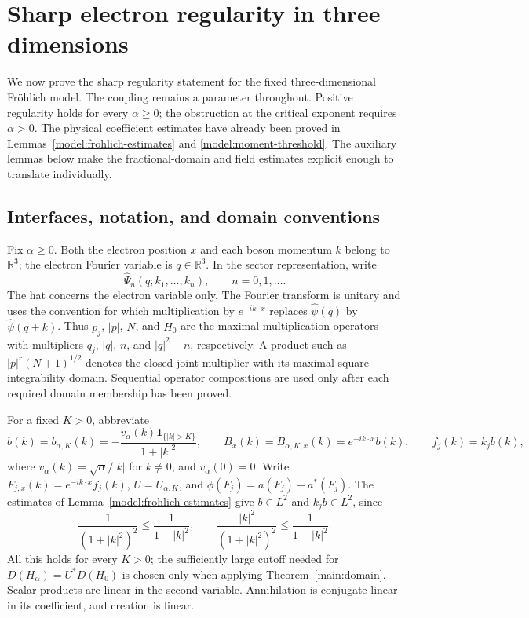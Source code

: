 \documentclass[11pt,a4paper]{article}
\theoremstyle{definition}
\theoremstyle{remark}
\begin{document}
\section{Sharp electron regularity in three dimensions}
\label{reg:section}

We now prove the sharp regularity statement for the fixed three-dimensional
Fr\"ohlich model. The coupling remains a parameter throughout. Positive
regularity holds for every \(\alpha\geq0\); the obstruction at the critical
exponent requires \(\alpha>0\). The physical coefficient estimates have
already been proved in Lemmas~\ref{model:frohlich-estimates} and
\ref{model:moment-threshold}. The auxiliary lemmas below make the
fractional-domain and field estimates explicit enough to translate
individually.

\subsection{Interfaces, notation, and domain conventions}
\label{reg:interfaces}

Fix \(\alpha\geq0\). Both the electron position \(x\) and each boson
momentum \(k\) belong to \(\mathbb R^3\); the electron Fourier variable
is \(q\in\mathbb R^3\). In the sector representation, write
\[
 \widehat\Psi_n(q;k_1,\ldots,k_n),\qquad n=0,1,\ldots.
\]
The hat concerns the electron variable only. The Fourier transform is
unitary and uses the convention for which multiplication by
\(e^{-ik\cdot x}\) replaces \(\widehat\psi(q)\) by
\(\widehat\psi(q+k)\). Thus \(p_j\), \(|p|\), \(N\), and \(H_0\)
are the maximal multiplication operators with multipliers \(q_j\),
\(|q|\), \(n\), and \(|q|^2+n\), respectively. A product such as
\(|p|^r(N+1)^{1/2}\) denotes the closed joint multiplier with its
maximal square-integrability domain. Sequential operator compositions
are used only after each required domain membership has been proved.

For a fixed \(K>0\), abbreviate
\begin{equation}
 b(k)=b_{\alpha,K}(k)
   =-\frac{v_\alpha(k)\mathbf1_{\{|k|>K\}}}{1+|k|^2},\qquad
 B_x(k)=B_{\alpha,K,x}(k)=e^{-ik\cdot x}b(k),\qquad f_j(k)=k_jb(k),
 \label{reg:def-b}
\end{equation}
where \(v_\alpha(k)=\sqrt\alpha/|k|\) for \(k\ne0\), and
\(v_\alpha(0)=0\). Write \(F_{j,x}(k)=e^{-ik\cdot x}f_j(k)\),
\(U=U_{\alpha,K}\), and \(\phi(F_j)=a(F_j)+a^*(F_j)\).
The estimates of Lemma~\ref{model:frohlich-estimates} give
\(b\in L^2\) and \(k_jb\in L^2\), since
\[
 \frac1{(1+|k|^2)^2}\leq\frac1{1+|k|^2},\qquad
 \frac{|k|^2}{(1+|k|^2)^2}\leq\frac1{1+|k|^2}.
\]
All this holds for every \(K>0\); the sufficiently large cutoff needed
for \(D(H_\alpha)=U^*D(H_0)\) is chosen only when applying
Theorem~\ref{main:domain}. Scalar products are linear in the second
variable. Annihilation is conjugate-linear in its coefficient, and
creation is linear.
\end{document}
